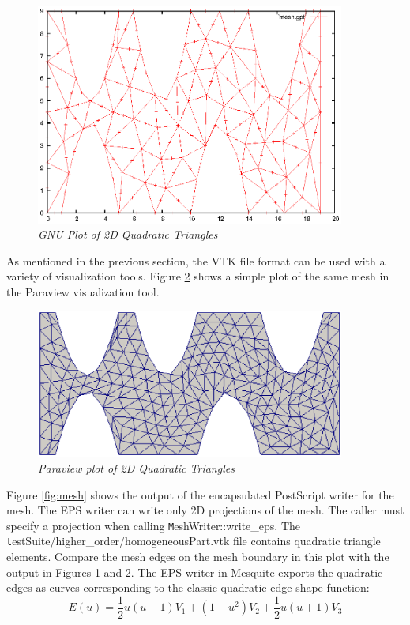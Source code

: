 \begin{figure}[htb!]
\begin{center}
\includegraphics[width=4in]{mesh_gpt}
\caption{\em GNU Plot of 2D Quadratic Triangles \label{fig:meshgpt}}
\end{center}
\end{figure}

As mentioned in the previous section, the VTK file format can be used with a variety of visualization tools.  Figure \ref{fig:meshvtk} shows a simple plot of the same mesh in the Paraview visualization tool.

\begin{figure}[htb!]
\begin{center}
\includegraphics[width=4in]{mesh_vtk}
\caption{\em Paraview plot of 2D Quadratic Triangles \label{fig:meshvtk}}
\end{center}
\end{figure}

Figure \ref{fig:mesh} shows the output of the encapsulated PostScript writer for the mesh.  The EPS writer can write only 2D projections of the mesh.  The caller must specify a projection when calling {\texttt MeshWriter::write\_eps}.  The {\texttt testSuite/higher\_order/homogeneousPart.vtk} file contains quadratic triangle elements.  Compare the mesh edges on the mesh boundary in this plot with the output in Figures \ref{fig:meshgpt} and \ref{fig:meshvtk}.  The EPS writer in Mesquite exports the quadratic edges as curves corresponding to the classic quadratic edge shape function:
\begin{displaymath}
E(u) = \frac{1}{2}u(u-1)V_1 + (1-u^2)V_2 + \frac{1}{2}u(u+1)V_3
\end{displaymath}

